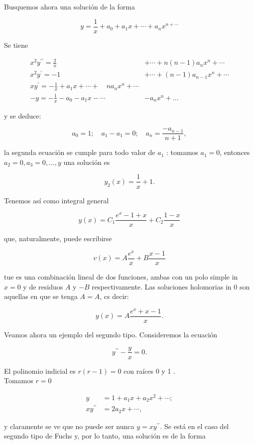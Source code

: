 \documentclass[10pt]{article}
\theoremstyle{plain}
\theoremstyle{definition}
\theoremstyle{remark}
\begin{document}
Busquemos ahora una solución de la forma

$$
y=\frac{1}{x}+a_{0}+a_{1} x+\cdots+a_{n} x^{n+\cdots}
$$

Se tiene


$$
\begin{array}{ll}
x^{2} y^{\prime \prime}=\frac{2}{x} & +\cdots+n(n-1) a_{n} x^{n}+\cdots \\
x^{2} y^{\prime}=-1 & +\cdots+(n-1) a_{n-1} x^{n}+\cdots \\
x y^{\prime}=-\frac{1}{x}+a_{1} x+\cdots+\quad n a_{n} x^{n}+\cdots \\
-y=-\frac{1}{x}-a_{0}-a_{1} x-\cdots & -a_{n} x^{n}+\ldots
\end{array}
$$

y se deduce:

$$
a_{0}=1 ; \quad a_{1}-a_{1}=0 ; \quad a_{n}=\frac{-a_{n-1}}{n+1},
$$

la segunda ecuación se cumple para todo valor de $a_{1}$ : tomamos $a_{1}=0$, entonces $a_{2}=0, a_{3}=0, \ldots, y$ una solución es

$$
y_{2}(x)=\frac{1}{x}+1 .
$$

Tenemos así como integral general

$$
y(x)=C_{1} \frac{e^{x}-1+x}{x}+C_{2} \frac{1-x}{x}
$$

que, naturalmente, puede escribirse

$$
v(x)=A \frac{e^{x}}{x}+B \frac{x-1}{x}
$$

tue es una combinación lineal de dos funciones, ambas con un polo simple in $x=0$ y de residuos $A$ y $-B$ respectivamente. Las soluciones holomorias in 0 son aquellas en que se tenga $A=A$, cs decir:

$$
y(x)=A \frac{e^{x}+x-1}{x} .
$$

Veamos ahora un ejemplo del segundo tipo. Consideremos la ecuación

$$
y^{\prime \prime}-\frac{y}{x}=0 .
$$

El polinomio indicial es $r(r-1)=0$ con raíces 0 y 1 .\\
Tomamos $r=0$

$$
\begin{aligned}
y & =1+a_{1} x+a_{2} x^{2}+\cdots ; \\
x y^{\prime \prime} & =2 a_{2} x+\cdots,
\end{aligned}
$$

y claramente se ve que no puede ser nunca $y=x y^{\prime \prime}$. Se está en el caso del segundo tipo de Fuchs y, por lo tanto, una solución es de la forma
\end{document}
